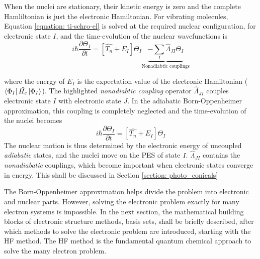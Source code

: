 When the nuclei are stationary, their kinetic energy is zero and the complete Hamliltonian is just the electronic Hamiltonian. For vibrating molecules, Equation \ref{equation: ti-schro-el} is solved at the required nuclear configuration, for electronic state $I$, and the time-evolution of the nuclear wavefunctions is\cite{Worth2004}
\begin{equation}\label{equation: nucwavefunctions}
    i\hbar{}\frac{\partial{}\Theta_{I}}{\partial{}t}=[\hat{T_{n}}+E_{I}]\Theta_{I}\underbrace{-\sum_{I}\hat{\Lambda}_{JI}\Theta_{I}}_\text{Nonadiabtic couplings}
\end{equation} 

where the energy of $E_{I}$ is the expectation value of the electronic Hamiltonian ($\bra{\Phi_{I}}\hat{H_e}\ket{\Phi_{I}}$). The highlighted \textit{nonadiabtic coupling} operator $\hat{\Lambda}_{JI}$ couples electronic state $I$ with electronic state $J$. In the adiabatic Born-Oppenheimer approximation, this coupling is completely neglected and the time-evolution of the nuclei becomes\cite{Yonehara2012}
\begin{equation}\label{equation: BO}
    i\hbar{}\frac{\partial{}\Theta_{I}}{\partial{}t}=[\hat{T_{n}}+E_{I}]\Theta_{I}
\end{equation} 
The nuclear motion is thus determined by the electronic energy of uncoupled \textit{adiabatic} states, and the nuclei move on the \ac{PES} of state $I$. $\hat{\Lambda}_{JI}$ contains the \textit{nonadiabatic} couplings, which become important when electronic states converge in energy. This shall be discussed in Section \ref{section: photo_conicals}

The Born-Oppenheimer approximation helps divide the problem into electronic and nuclear parts. However, solving the electronic problem exactly for many electron systems is impossible. In the next section, the mathematical building blocks of electronic structure methods, basis sets, shall be briefly described, after which methods to solve the electronic problem are introduced, starting with the \acf{HF} method. The \ac{HF} method is the fundamental quantum chemical approach to solve the many electron problem.

